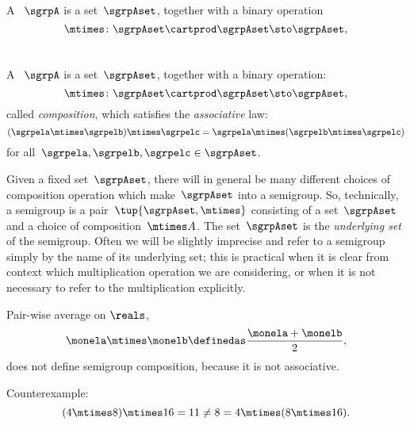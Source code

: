 
\begin{definition}[Magma]
  \label{def:magma}
  A \emph{}~$\sgrpA$ is a set~$\sgrpAset$, together with a binary operation
  \begin{equation}
    \mtimes  \colon \sgrpAset \cartprod \sgrpAset \sto \sgrpAset,
  \end{equation}
 \end{definition}


\section{}\label{sec:semigroups}

\begin{ctdefinition}[Semigroup]
  \label{def:semigroup}
  A \emph{}~$\sgrpA$ is a set~$\sgrpAset$, together with a binary operation:
  \begin{equation}
    \mtimes  \colon \sgrpAset \cartprod \sgrpAset \sto \sgrpAset,
  \end{equation}
  called \emph{composition}, which satisfies the \emph{associative} law:
  \begin{equation}
    \label{eq:semigroup-associative}
    (\sgrpela \mtimes   \sgrpelb)\mtimes   \sgrpelc
    = \sgrpela \mtimes   (\sgrpelb \mtimes  \sgrpelc)
  \end{equation}
  for all~$\sgrpela , \sgrpelb, \sgrpelc \in \sgrpAset$.
\end{ctdefinition}


\begin{remark}
  Given a fixed set~$\sgrpAset$, there will in general be many different choices of composition operation which make~$\sgrpAset$ into a semigroup.
  So, technically, a semigroup is a pair~$\tup{\sgrpAset, \mtimes}$ consisting of a set~$\sgrpAset$ and a choice of composition~$\mtimes A$.
  The set~$\sgrpAset$ is the \emph{underlying set} of the semigroup.
  Often we will be slightly imprecise and refer to a semigroup simply by the name of its underlying set;
  this is practical when it is clear from context which multiplication operation we are considering, or when it is not necessary to refer to the multiplication explicitly.
\end{remark}



\begin{example}
Pair-wise average on $\reals$,
\begin{equation}
    \label{eq:pairwise}
    \monela \mtimes \monelb \definedas  \frac{\monela + \monelb}{2},
\end{equation}
does not define semigroup composition, because it is not associative.

Counterexample:
\begin{equation}\label{eq:pairwise-counterexample}
(4 \mtimes 8) \mtimes 16 = 11 \neq  8 = 4 \mtimes (8 \mtimes 16).
\end{equation}
\end{example}



